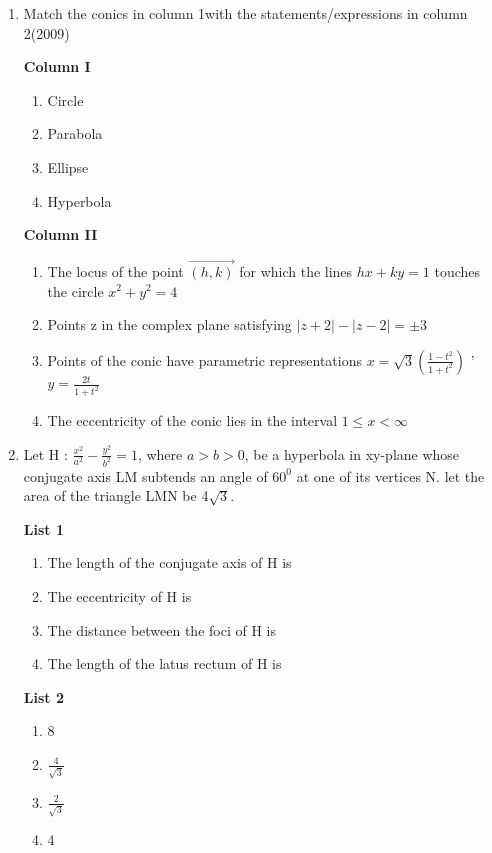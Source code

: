 \begin{enumerate}
\item Match the conics in column 1with the statements/expressions in column 2\hfill{(2009)}

\begin{multicols}{2}
\textbf{Column I}
\begin{enumerate}
    \item  Circle
    \item  Parabola
    \item  Ellipse 
    \item  Hyperbola  
\end{enumerate} 
\columnbreak
\textbf{Column II}
\begin{enumerate}
	\item The locus of the point $\vec{(h,k)}$ for which the lines $hx + ky =1$ touches the circle $x^2 + y^2 = 4$
    \item Points z in the complex plane satisfying $|z + 2|- |z - 2|= \pm 3$
    \item Points of the conic have parametric representations $x=\sqrt{3}
(\frac{1 - t^2}{1 + t^2})$ ' $ y = \frac{2t}{1 + t^2}$

    \item The eccentricity of the conic lies in the interval $1 \leq x < \infty$

\end{enumerate}
\end{multicols}


 \item Let H : $\frac{x^2}{a^2}-\frac{y^2}{b^2}= 1$, where $a>b>0$, be a hyperbola in xy-plane whose conjugate axis LM subtends an angle of $60^0$ at one of its vertices N. let the area of the triangle LMN be 4$\sqrt{3}$.

\begin{multicols}{2}
\textbf{List 1}
\begin{enumerate}
    \item The length of the conjugate axis of H is
    \item The eccentricity of H is
    \item The distance between the foci of H is
    \item The length of the latus rectum of H is
\end{enumerate}
\columnbreak


\textbf{List 2}
\begin{enumerate}
    \item 8
    \item $\frac{4}{\sqrt{3}}$
    \item $\frac{2}{\sqrt{3}}$
    \item 4


\end{enumerate}
\end{multicols}
\end{enumerate}
